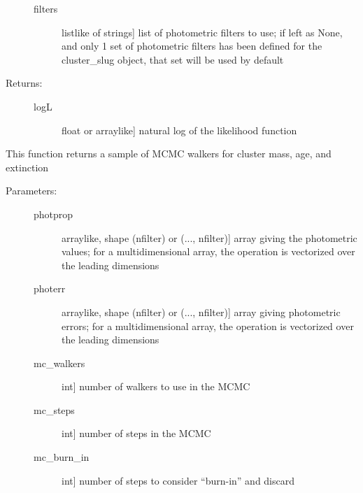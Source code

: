 \documentclass[letterpaper,10pt,english]{sphinxmanual}
\begin{document}
\begin{fulllineitems}
\begin{fulllineitems}
\begin{description}
\begin{description}
\item[{filters}] \leavevmode{[}listlike of strings{]}
list of photometric filters to use; if left as None, and
only 1 set of photometric filters has been defined for
the cluster\_slug object, that set will be used by
default

\end{description}

\item[{Returns:}] \leavevmode\begin{description}
\item[{logL}] \leavevmode{[}float or arraylike{]}
natural log of the likelihood function

\end{description}

\end{description}

\end{fulllineitems}


\begin{fulllineitems}
\label{cluster_slug:slugpy.cluster_slug.cluster_slug.mcmc}
This function returns a sample of MCMC walkers for cluster
mass, age, and extinction
\begin{description}
\item[{Parameters:}] \leavevmode\begin{description}
\item[{photprop}] \leavevmode{[}arraylike, shape (nfilter) or (..., nfilter){]}
array giving the photometric values; for a
multidimensional array, the operation is vectorized over
the leading dimensions

\item[{photerr}] \leavevmode{[}arraylike, shape (nfilter) or (..., nfilter){]}
array giving photometric errors; for a multidimensional
array, the operation is vectorized over the leading
dimensions

\item[{mc\_walkers}] \leavevmode{[}int{]}
number of walkers to use in the MCMC

\item[{mc\_steps}] \leavevmode{[}int{]}
number of steps in the MCMC

\item[{mc\_burn\_in}] \leavevmode{[}int{]}
number of steps to consider ``burn-in'' and discard


\end{description}
\end{description}
\end{fulllineitems}
\end{fulllineitems}
\end{document}
